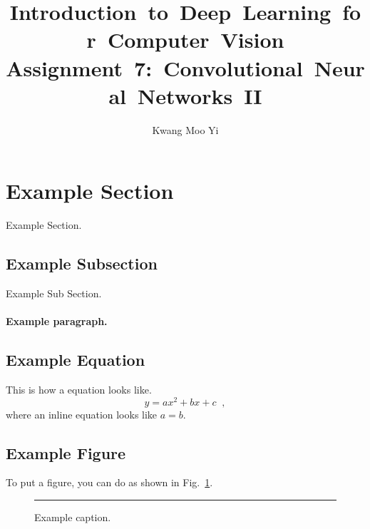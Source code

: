 \documentclass[12pt, letter]{article}
\newcommand{\courseName}{Introduction~to~Deep~Learning~for~Computer~Vision}
\newcommand{\assignName}{Assignment~7:~Convolutional~Neural~Networks~II}
\begin{document}
\pagestyle{titlesec_assignment}

\title{\courseName\\\assignName}
\author{Kwang Moo Yi}
\maketitle


\section{Example Section}

Example Section. \lipsum[1]

\subsection{Example Subsection}

Example Sub Section. \lipsum[1]

\paragraph{Example paragraph.} \lipsum[1]


\subsection{Example  Equation}

This is how a equation looks like.
\begin{equation}
  y = a x^2 + b x + c
  \;\;, 
\end{equation}
where an inline equation looks like $a=b$.

\subsection{Example  Figure}

To put a figure, you can do as shown in Fig.~\ref{fig:eg}.
\begin{figure}
  \centering
  \rule{2cm}{2cm} %
  \caption{Example caption.}
  \label{fig:eg}
\end{figure}
\end{document}
